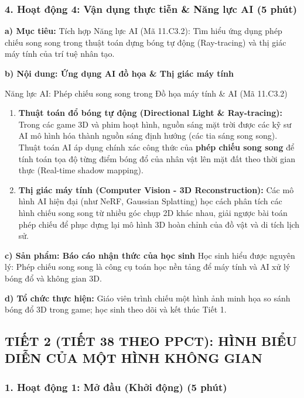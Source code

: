 \documentclass[12pt, a4paper]{article}
\begin{document}
\subsubsection*{4. Hoạt động 4: Vận dụng thực tiễn & Năng lực AI (5 phút)}

\noindent \textbf{a) Mục tiêu:}
Tích hợp Năng lực AI (Mã 11.C3.2): Tìm hiểu ứng dụng phép chiếu song song trong thuật toán dựng bóng tự động (Ray-tracing) và thị giác máy tính của trí tuệ nhân tạo.

\noindent \textbf{b) Nội dung: Ứng dụng AI đồ họa \& Thị giác máy tính}
\begin{aibox}{Năng lực AI: Phép chiếu song song trong Đồ họa máy tính \& AI (Mã 11.C3.2)}
\begin{enumerate}[leftmargin=0.6cm]
    \item \textbf{Thuật toán đổ bóng tự động (Directional Light \& Ray-tracing):}
    Trong các game 3D và phim hoạt hình, nguồn sáng mặt trời được các kỹ sư AI mô hình hóa thành nguồn sáng định hướng (các tia sáng song song). Thuật toán AI áp dụng chính xác công thức của \textbf{phép chiếu song song} để tính toán tọa độ từng điểm bóng đổ của nhân vật lên mặt đất theo thời gian thực (Real-time shadow mapping).
    \item \textbf{Thị giác máy tính (Computer Vision - 3D Reconstruction):}
    Các mô hình AI hiện đại (như NeRF, Gaussian Splatting) học cách phân tích các hình chiếu song song từ nhiều góc chụp 2D khác nhau, giải ngược bài toán phép chiếu để phục dựng lại mô hình 3D hoàn chỉnh của đồ vật và di tích lịch sử.
\end{enumerate}
\end{aibox}

\noindent \textbf{c) Sản phẩm: Báo cáo nhận thức của học sinh}
Học sinh hiểu được nguyên lý: Phép chiếu song song là công cụ toán học nền tảng để máy tính và AI xử lý bóng đổ và không gian 3D.

\noindent \textbf{d) Tổ chức thực hiện:}
Giáo viên trình chiếu một hình ảnh minh họa so sánh bóng đổ 3D trong game; học sinh theo dõi và kết thúc Tiết 1.

\subsection*{TIẾT 2 (TIẾT 38 THEO PPCT): HÌNH BIỂU DIỄN CỦA MỘT HÌNH KHÔNG GIAN}

\subsubsection*{1. Hoạt động 1: Mở đầu (Khởi động) (5 phút)}
\end{document}
